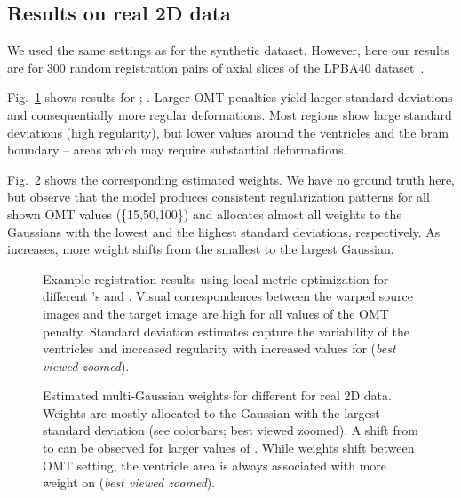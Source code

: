 \documentclass[10pt,twocolumn,letterpaper,table]{article}
\numberwithin{equation}{section}
\theoremstyle{plain}
\theoremstyle{definition}
\begin{document}
\subsection{Results on real 2D data}
\label{subsec:real_2d_experiment}

We used the same settings as for the synthetic dataset. However, here our results are for 300 random registration pairs of axial slices of the LPBA40 dataset~\cite{klein2009}. 

Fig.~\ref{fig:real_example_results_images} shows results for ; . Larger OMT penalties yield larger standard deviations and consequentially more regular deformations. Most regions show large standard deviations (high regularity), but lower values around the ventricles and the brain boundary -- areas which may require substantial deformations. 

Fig.~\ref{fig:real_example_results_weights} shows the corresponding estimated weights. We have no ground truth here, but observe that the model produces consistent regularization patterns for all shown OMT values (\{15,50,100\}) and allocates almost all weights to the Gaussians with the lowest and the highest standard deviations, respectively. As  increases, more weight shifts from the smallest to the largest Gaussian.

\begin{figure}[t!]
\caption{Example registration results using local metric optimization for different 's and . Visual correspondences between the warped source images and the target image are high for all values of the OMT penalty. Standard deviation estimates capture the variability of the ventricles and increased regularity with increased values for  (\emph{best viewed zoomed}).}
  \label{fig:real_example_results_images}
  \vspace{-0.3cm}
\end{figure}

\begin{figure}[t!]
  \caption{Estimated multi-Gaussian weights for different  for real 2D data. Weights are mostly allocated to the Gaussian with the largest standard deviation (see colorbars; best viewed zoomed). A shift from  to  can be observed for larger values of . While weights shift between OMT setting, the ventricle area is always associated with more weight on  (\emph{best viewed zoomed}).} 
  \label{fig:real_example_results_weights}
  \vspace{-0.5cm}
\end{figure}
\end{document}
